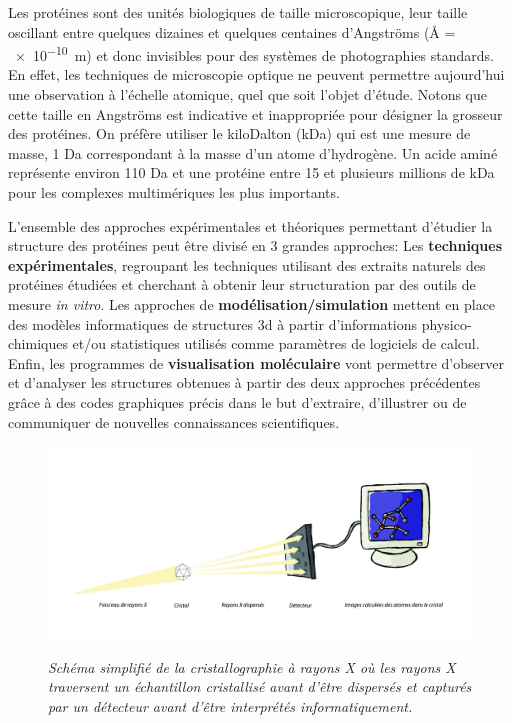Les protéines sont des unités biologiques de taille microscopique, leur taille oscillant entre quelques dizaines et quelques centaines d'Angströms (\r{A} = \SI{e-10}{\metre}) et donc invisibles pour des systèmes de photographies standards. En effet, les techniques de microscopie optique ne peuvent permettre aujourd'hui une observation à l'échelle atomique, quel que soit l'objet d'étude. Notons que cette taille en Angströms est indicative et inappropriée pour désigner la grosseur des protéines. On préfère utiliser le kiloDalton (kDa) qui est une mesure de masse, 1 Da correspondant à la masse d'un atome d'hydrogène. Un acide aminé représente environ 110 Da et une protéine entre 15 et plusieurs millions de kDa pour les complexes multimériques les plus importants.

L'ensemble des approches expérimentales et théoriques permettant d'étudier la structure des protéines peut être divisé en 3 grandes approches: Les \textbf{techniques expérimentales}, regroupant les techniques utilisant des extraits naturels des protéines étudiées et cherchant à obtenir leur structuration par des outils de mesure \textit{in vitro}. Les approches de \textbf{modélisation/simulation} mettent en place des modèles informatiques de structures 3d à partir d'informations physico-chimiques et/ou statistiques utilisés comme paramètres de logiciels de calcul. Enfin, les programmes de \textbf{visualisation moléculaire} vont permettre d'observer et d'analyser les structures obtenues à partir des deux approches précédentes grâce à des codes graphiques précis dans le but d'extraire, d'illustrer ou de communiquer de nouvelles connaissances scientifiques.

\begin{figure}[h]
  \centering
  {\includegraphics[width=0.9\linewidth]{./figures/ch1/cristallographie_x_ray.pdf}}
    \caption{\it Schéma simplifié de la cristallographie à rayons X où les rayons X traversent un échantillon cristallisé avant d'être dispersés et capturés par un détecteur avant d'être interprétés informatiquement.}
    \label{Fig:cristallographie_x_ray}
  \hspace{0.2cm}
\end{figure}

